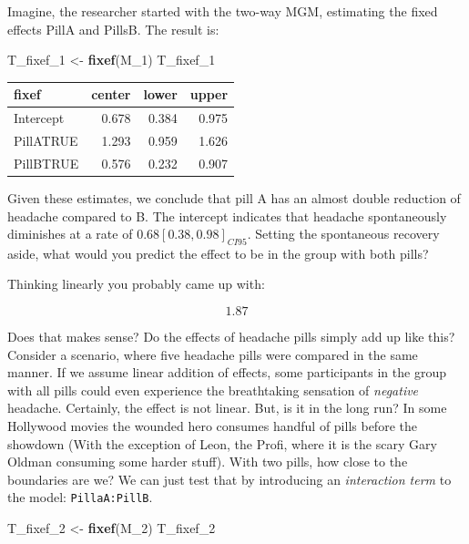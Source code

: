 \documentclass[]{svmono}
\newenvironment{Shaded}{\begin{snugshade}}{\end{snugshade}}
\newcommand{\KeywordTok}[1]{\textcolor[rgb]{0.13,0.29,0.53}{\textbf{#1}}}
\newcommand{\DecValTok}[1]{\textcolor[rgb]{0.00,0.00,0.81}{#1}}
\newcommand{\StringTok}[1]{\textcolor[rgb]{0.31,0.60,0.02}{#1}}
\newcommand{\NormalTok}[1]{#1}
\theoremstyle{definition}
\theoremstyle{definition}
\theoremstyle{definition}
\theoremstyle{remark}
\begin{document}
Imagine, the researcher started with the two-way MGM, estimating the
fixed effects PillA and PillsB. The result is:

\begin{Shaded}
\begin{Highlighting}[]
\NormalTok{T_fixef_}\DecValTok{1}\NormalTok{ <-}\StringTok{ }\KeywordTok{fixef}\NormalTok{(M_}\DecValTok{1}\NormalTok{)}
\NormalTok{T_fixef_}\DecValTok{1}
\end{Highlighting}
\end{Shaded}

\begin{longtable}[]{@{}lrrr@{}}
\toprule
fixef & center & lower & upper\tabularnewline
\midrule
\endhead
Intercept & 0.678 & 0.384 & 0.975\tabularnewline
PillATRUE & 1.293 & 0.959 & 1.626\tabularnewline
PillBTRUE & 0.576 & 0.232 & 0.907\tabularnewline
\bottomrule
\end{longtable}

Given these estimates, we conclude that pill A has an almost double
reduction of headache compared to B. The intercept indicates that
headache spontaneously diminishes at a rate of
\(0.68 [0.38, 0.98]_{CI95}\). Setting the spontaneous recovery aside,
what would you predict the effect to be in the group with both pills?

Thinking linearly you probably came up with:

\[1.87\]

Does that makes sense? Do the effects of headache pills simply add up
like this? Consider a scenario, where five headache pills were compared
in the same manner. If we assume linear addition of effects, some
participants in the group with all pills could even experience the
breathtaking sensation of \emph{negative} headache. Certainly, the
effect is not linear. But, is it in the long run? In some Hollywood
movies the wounded hero consumes handful of pills before the showdown
(With the exception of Leon, the Profi, where it is the scary Gary
Oldman consuming some harder stuff). With two pills, how close to the
boundaries are we? We can just test that by introducing an
\emph{interaction term} to the model: \texttt{PillaA:PillB}.

\begin{Shaded}
\begin{Highlighting}[]
\NormalTok{T_fixef_}\DecValTok{2}\NormalTok{ <-}\StringTok{  }\KeywordTok{fixef}\NormalTok{(M_}\DecValTok{2}\NormalTok{)}
\NormalTok{T_fixef_}\DecValTok{2}
\end{Highlighting}
\end{Shaded}
\end{document}
